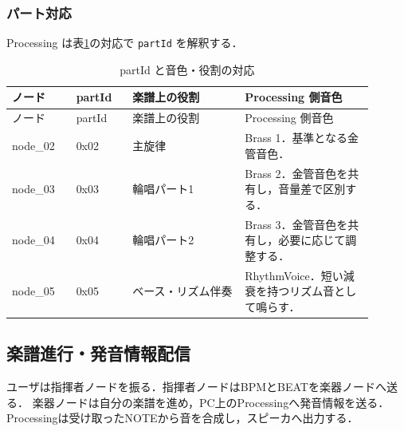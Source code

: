 \documentclass[lualatex,book,paper=a4paper,jafontsize=11.5pt,jafontscale=1.05]{jlreq}
\begin{document}
\subsubsection{パート対応}
Processing は表\ref{tab:part-map}の対応で \texttt{partId} を解釈する．

\begin{longtable}{p{0.16\linewidth}p{0.14\linewidth}p{0.28\linewidth}p{0.32\linewidth}}
\caption{partId と音色・役割の対応}\label{tab:part-map}\\
\toprule
ノード & partId & 楽譜上の役割 & Processing 側音色 \\
\midrule
\endfirsthead
\toprule
ノード & partId & 楽譜上の役割 & Processing 側音色 \\
\midrule
\endhead
node\_02 & 0x02 & 主旋律 & Brass 1．基準となる金管音色． \\
node\_03 & 0x03 & 輪唱パート1 & Brass 2．金管音色を共有し，音量差で区別する． \\
node\_04 & 0x04 & 輪唱パート2 & Brass 3．金管音色を共有し，必要に応じて調整する． \\
node\_05 & 0x05 & ベース・リズム伴奏 & RhythmVoice．短い減衰を持つリズム音として鳴らす． \\
\bottomrule
\end{longtable}

\subsection{楽譜進行・発音情報配信}
ユーザは指揮者ノードを振る．指揮者ノードはBPMとBEATを楽器ノードへ送る．
楽器ノードは自分の楽譜を進め，PC上のProcessingへ発音情報を送る．
Processingは受け取ったNOTEから音を合成し，スピーカへ出力する．
\end{document}
